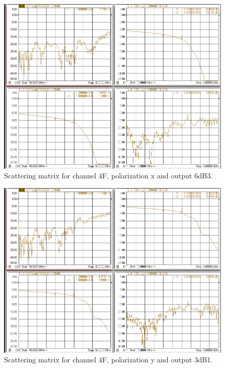 \documentclass[12pt,a4paper,oneside]{article}
\begin{document}
\begin{figure}[H]
\centering
\includegraphics[width=0.9\linewidth]{VNA_results/4Fx_6dB3.png}
\caption{Scattering matrix for channel 4F, polarization x and output 6dB3.}
\label{fig:4Fx_6dB3}
\end{figure}


\begin{figure}[H]
\centering
\includegraphics[width=0.9\linewidth]{VNA_results/4Fy_3dB1.png}
\caption{Scattering matrix for channel 4F, polarization y and output 3dB1.}
\label{fig:4Fy_3dB1}
\end{figure}
\end{document}
